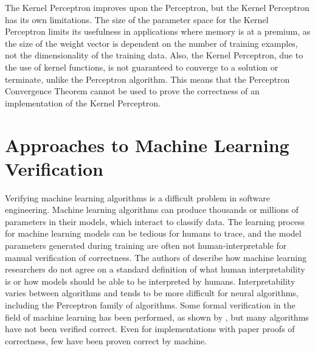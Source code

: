 The Kernel Perceptron improves upon the Perceptron, but the Kernel Perceptron has its own limitations. The size of the parameter space for the Kernel Perceptron limits its usefulness in applications where memory is at a premium, as the size of the weight vector is dependent on the number of training examples, not the dimensionality of the training data. Also, the Kernel Perceptron, due to the use of kernel functions, is not guaranteed to converge to a solution or terminate, unlike the Perceptron algorithm. This means that the Perceptron Convergence Theorem cannot be used to prove the correctness of an implementation of the Kernel Perceptron.
\section{Approaches to Machine Learning Verification}\label{MLVerificationSection}
Verifying machine learning algorithms is a difficult problem in software engineering. Machine learning algorithms can produce thousands or millions of parameters in their models, which interact to classify data. The learning process for machine learning models can be tedious for humans to trace, and the model parameters generated during training are often not human-interpretable for manual verification of correctness. The authors of \cite{BF16} describe how machine learning researchers do not agree on a standard definition of what human interpretability is or how models should be able to be interpreted by humans. Interpretability varies between algorithms and tends to be more difficult for neural algorithms, including the Perceptron family of algorithms. Some formal verification in the field of machine learning has been performed, as shown by \cite{TD05}, but many algorithms have not been verified correct. Even for implementations with paper proofs of correctness, few have been proven correct by machine.
